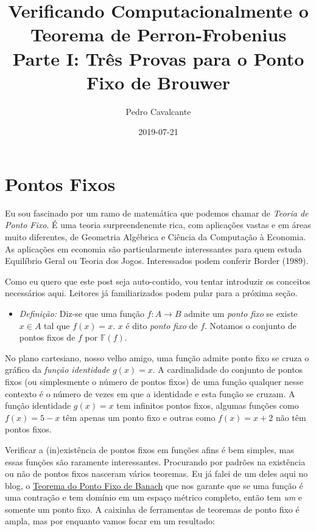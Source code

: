 \documentclass[]{article}
\title{Verificando Computacionalmente o Teorema de Perron-Frobenius Parte I:
Três Provas para o Ponto Fixo de Brouwer}
\author{Pedro Cavalcante}
\date{2019-07-21}
\providecommand{\tightlist}{%
  \setlength{\itemsep}{0pt}\setlength{\parskip}{0pt}}
\begin{document}
\maketitle

\section{Pontos Fixos}\label{pontos-fixos}

Eu sou fascinado por um ramo de matemática que podemos chamar de
\emph{Teoria de Ponto Fixo}. É uma teoria surpreendenemte rica, com
aplicações vastas e em áreas muito diferentes, de Geometria Algébrica e
Ciência da Computação à Economia. As aplicações em economia são
particularmente interessantes para quem estuda Equilíbrio Geral ou
Teoria dos Jogos. Interessados podem conferir Border (1989).

Como eu quero que este post seja auto-contido, vou tentar introduzir os
conceitos necessários aqui. Leitores já familiarizados podem pular para
a próxima seção.

\begin{itemize}
\tightlist
\item
  \emph{Definição:} Diz-se que uma função \(f: A \to B\) admite um
  \emph{ponto fixo} se existe \(x \in A\) tal que \(f(x) = x\). \(x\) é
  dito \emph{ponto fixo} de \(f\). Notamos o conjunto de pontos fixos de
  \(f\) por \(\mathbb{F} (f)\).
\end{itemize}

No plano cartesiano, nosso velho amigo, uma função admite ponto fixo se
cruza o gráfico da \emph{função identidade \(g(x) = x\)}. A
cardinalidade do conjunto de pontos fixos (ou simplesmente o número de
pontos fixos) de uma função qualquer nesse contexto é o número de vezes
em que a identidade e esta função se cruzam. A função identidade
\(g(x) = x\) tem infinitos pontos fixos, algumas funções como
\(f(x) = 5 - x\) têm apenas um ponto fixo e outras como \(f(x) = x + 2\)
não têm pontos fixos.

Verificar a (in)existência de pontos fixos em funções afins é bem
simples, mas essas funções são raramente interessantes. Procurando por
padrões na existência ou não de pontos fixos nasceram vários teoremas.
Eu já falei de um deles aqui no blog, o
\href{https://azul.netlify.com/2018/10/31/banach/}{Teorema do Ponto Fixo
de Banach} que nos garante que se uma função é uma contração e tem
domínio em um espaço métrico completo, então tem \emph{um} e somente um
ponto fixo. A caixinha de ferramentas de teoremas de ponto fixo é ampla,
mas por enquanto vamos focar em um resultado:
\end{document}
